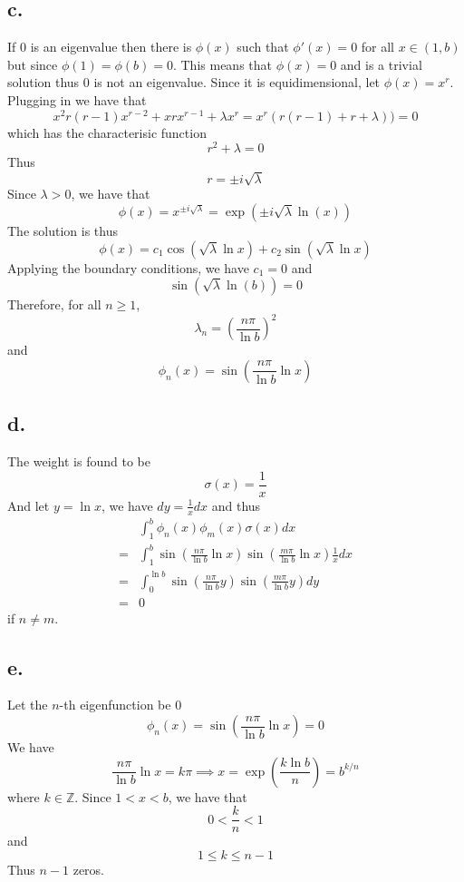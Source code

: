 \documentclass[11pt]{article}
\theoremstyle{mystyle}
\theoremstyle{definition}
\begin{document}
\subsection*{c.}
If 0 is an eigenvalue then there is $\phi(x)$ such that $\phi'(x) = 0$ for all $x \in (1,b)$ but since $\phi(1) = \phi(b) = 0$. This means that $\phi(x) = 0$ and is a trivial solution thus 0 is not an eigenvalue. 
Since it is equidimensional, let $\phi(x) = x^r$. Plugging in we have that
\[
  x^2 r(r-1)x^{r-2} + xrx^{r-1} + \lambda x^r = x^r (r(r-1) + r + \lambda)) = 0  
\]
which has the characterisic function 
\[
  r^2 + \lambda = 0
\]
Thus 
\[
  r = \pm i\sqrt{\lambda}
\]
Since $\lambda > 0$, we have that 
\[
  \phi(x) = x^{\pm i \sqrt{\lambda}} = \exp(\pm i\sqrt{\lambda}\ln(x))
\]
The solution is thus 
\[
  \phi(x) = c_1 \cos(\sqrt{\lambda} \ln x) + c_2 \sin(\sqrt{\lambda} \ln x)
\]
Applying the boundary conditions, we have $c_1 = 0$ and 
\[
  \sin(\sqrt{\lambda} \ln(b)) = 0
\]
Therefore, for all $n\ge 1$,  
\[
  \lambda_n = \left( \displaystyle\frac{n\pi}{\ln b} \right)^2 
\]
and 
\[
  \phi_n(x) = \sin \left(\displaystyle\frac{n\pi}{\ln b} \ln x\right)
\]
\subsection*{d.}
The weight is found to be 
\[
  \sigma(x) = \displaystyle\frac{1}{x}
\]
And let $y = \ln x$, we have $dy = \displaystyle\frac{1}{x} dx$ and thus  
\begin{align*}
  &\int_1^b \phi_n(x) \phi_m(x) \sigma(x) dx \\
  =& \int_1^b \sin\left(\displaystyle\frac{n\pi}{\ln b} \ln x\right) \sin\left(\displaystyle\frac{m\pi}{\ln b} \ln x\right) \displaystyle\frac{1}{x} dx \\
  =& \int_0^{\ln b} \sin\left(\displaystyle\frac{n\pi}{\ln b} y\right) \sin\left(\displaystyle\frac{m\pi}{\ln b} y\right) dy \\
  =& 0 
\end{align*}
if $n \ne m$. 
\subsection*{e.}
Let the $n$-th eigenfunction be 0
\[
  \phi_n(x) = \sin \left(\displaystyle\frac{n\pi}{\ln b} \ln x\right) = 0
\]
We have 
\[
  \displaystyle\frac{n \pi}{\ln b} \ln x = k \pi \implies x = \exp\left(\displaystyle\frac{k\ln b}{n}\right) = b^{k/n}
\]
where $k \in \mathbb{Z}$. Since $1<x<b$, we have that 
\[
  0< \displaystyle\frac{k}{n} < 1
\]
and 
\[
  1 \le k \le n-1
\]
Thus $n-1$ zeros.
\newpage
\end{document}
